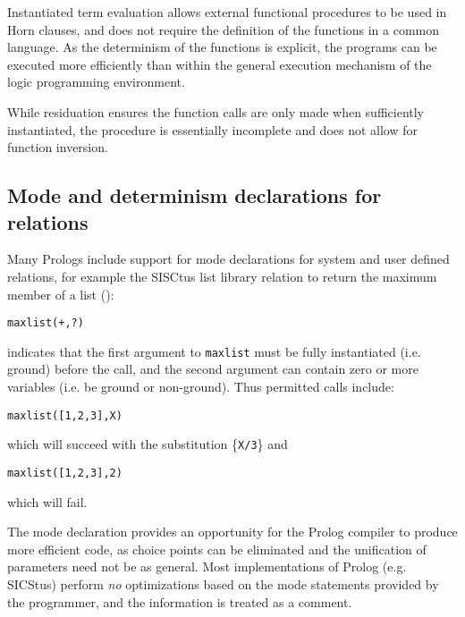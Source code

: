 Instantiated term evaluation allows external functional procedures to be used in Horn clauses,
and does not require the definition of the functions in a common language.  As the determinism of
the functions is explicit, the programs can be executed more efficiently than within the
general execution mechanism of the logic programming environment.

While residuation
ensures the function calls are only made when sufficiently instantiated, the procedure is
essentially incomplete and does not allow for function inversion.

\subsection{Mode and determinism declarations for relations}
\label{modes}

Many Prologs include support for mode declarations for system and user defined relations,
for example the SISCtus list library relation to return the maximum member of
a list (\cite{BBP+94}):\\
\begin{center}\texttt{maxlist(+,?)}\end{center}
indicates that the first argument to \texttt{maxlist} must be fully
instantiated (i.e. ground) before the call,
and the second argument can contain zero or more variables
(i.e. be ground or non-ground).  Thus permitted calls include:\\
\begin{center}\texttt{maxlist([1,2,3],X)}\end{center}
which will succeed with the substitution \{\texttt{X/3}\} and\\
\begin{center}\texttt{maxlist([1,2,3],2)}\end{center}
which will fail.

The mode declaration provides an opportunity for the Prolog compiler to produce more efficient
code, as choice points can be eliminated and the unification of parameters need not be as
general.  Most implementations of Prolog (e.g. SICStus) perform \textit{no}
optimizations based on the mode statements provided by the programmer, and the information is
treated as a comment.

